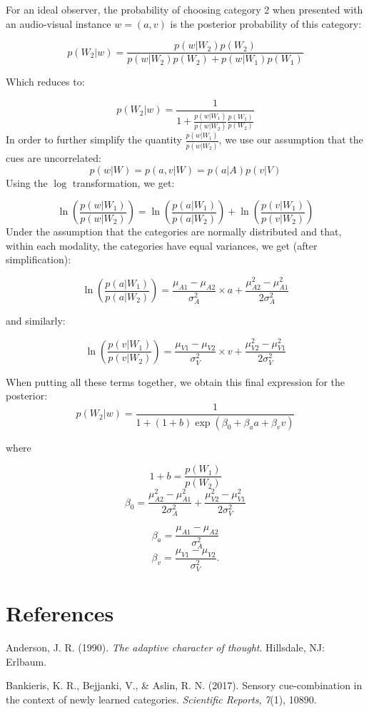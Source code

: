 \documentclass[english,,man,floatsintext]{apa6}
\theoremstyle{definition}
\theoremstyle{definition}
\theoremstyle{definition}
\theoremstyle{remark}
\begin{document}
For an ideal observer, the probability of choosing category 2 when
presented with an audio-visual instance \(w = (a, v)\) is the posterior
probability of this category:

\[p(W_2 | w)=\frac{p(w|W_2)p(W_2)}{p(w|W_2)p(W_2)+p(w|W_1)p(W_1)}\]

Which reduces to:

\[p(W_2 | w)=\frac{1}{1+\frac{p(w|W_1)}{p(w|W_2)} \frac{p(W_1)}{p(W_2)}}\]
In order to further simplify the quantity \(\frac{p(w|W_1)}{p(w|W_2)}\),
we use our assumption that the cues are uncorrelated:
\[p(w | W) = p(a,v| W) = p(a| A)p(v| V)\] Using the \(\log\)
transformation, we get:

\[ \ln(\frac{p(w |W_1)}{p(w|W_2)})=\ln(\frac{p(a|W_1)}{p(a|W_2)})+\ln(\frac{p(v|W_1)}{p(v|W_2)}) \]
Under the assumption that the categories are normally distributed and
that, within each modality, the categories have equal variances, we get
(after simplification):

\[\ln(\frac{p(a|W_1)}{p(a|W_2)})=\frac{\mu_{A1}-\mu_{A2}}{\sigma^2_{A}}\times a+ \frac{\mu^2_{A2}-\mu^2_{A1}}{2\sigma^2_{A}}\]

and similarly:

\[\ln(\frac{p(v|W_1)}{p(v|W_2)})=\frac{\mu_{V1}-\mu_{V2}}{\sigma^2_{V}}\times v+ \frac{\mu^2_{V2}-\mu^2_{V1}}{2\sigma^2_{V}}\]

When putting all these terms together, we obtain this final expression
for the posterior:
\[p(W_2 | w)=\frac{1}{1+(1+b)\exp(\beta_0+\beta_aa+\beta_vv)}\]

where

\[1+b=\frac{p(W_1)}{p(W_2)}\]
\[\beta_0=\frac{\mu^2_{A2}-\mu^2_{A1}}{2\sigma^2_{A}}+\frac{\mu^2_{V2}-\mu^2_{V1}}{2\sigma^2_{V}}\]

\[\beta_a=\frac{\mu_{A1}-\mu_{A2}}{\sigma^2_{A}}\]
\[\beta_v=\frac{\mu_{V1}-\mu_{V2}}{\sigma^2_{V}}.\]

\section{References}\label{references}

\setlength{\parindent}{-0.5in} \setlength{\leftskip}{0.5in}

\hypertarget{refs}{}
\hypertarget{ref-anderson90}{}
Anderson, J. R. (1990). \emph{The adaptive character of thought}.
Hillsdale, NJ: Erlbaum.

\hypertarget{ref-Bankieris17}{}
Bankieris, K. R., Bejjanki, V., \& Aslin, R. N. (2017). Sensory
cue-combination in the context of newly learned categories.
\emph{Scientific Reports}, \emph{7}(1), 10890.
\end{document}
